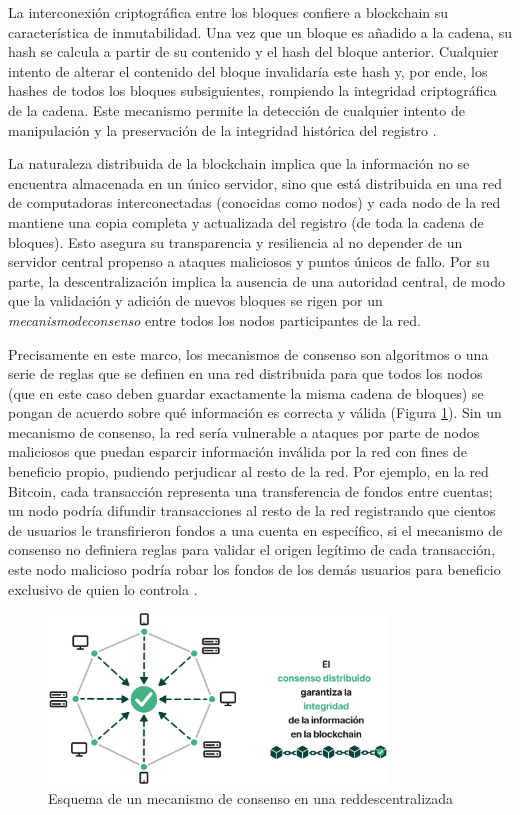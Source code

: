 La interconexión criptográfica entre los bloques confiere a blockchain su característica de inmutabilidad. Una vez que un bloque es añadido a la cadena, su hash se calcula a partir de su contenido y el hash del bloque anterior. Cualquier intento de alterar el contenido del bloque invalidaría este hash y, por ende, los hashes de todos los bloques subsiguientes, rompiendo la integridad criptográfica de la cadena. Este mecanismo permite la detección de cualquier intento de manipulación y la preservación de la integridad histórica del registro \cite{bulkowska2023implementation}. 

La naturaleza distribuida de la blockchain implica que la información no se encuentra almacenada en un único servidor, sino que está distribuida en una red de computadoras interconectadas (conocidas como nodos) y cada \gls{nodo} de la red mantiene una copia completa y actualizada del registro (de toda la cadena de bloques). Esto asegura su transparencia y resiliencia al no depender de un servidor central \cite{bulkowska2023implementation} propenso a ataques maliciosos y puntos únicos de fallo. Por su parte, la descentralización implica la ausencia de una autoridad central, de modo que la validación y adición de nuevos bloques se rigen por un \textit{\gls{mecanismodeconsenso}} entre todos los nodos participantes de la red. 

Precisamente en este marco, los mecanismos de consenso son algoritmos o una serie de reglas que se definen en una red distribuida para que todos los nodos (que en este caso deben guardar exactamente la misma cadena de bloques) se pongan de acuerdo sobre qué información es correcta y válida (Figura \ref{fig:decentralized-consensus}). Sin un mecanismo de consenso, la red sería vulnerable a ataques por parte de nodos maliciosos que puedan esparcir información inválida por la red con fines de beneficio propio, pudiendo perjudicar al resto de la red. Por ejemplo, en la red Bitcoin, cada transacción representa una transferencia de fondos entre cuentas; un nodo podría difundir transacciones al resto de la red registrando que cientos de usuarios le transfirieron fondos a una cuenta en específico, si el mecanismo de consenso no definiera reglas para validar el origen legítimo de cada transacción, este nodo malicioso podría robar los fondos de los demás usuarios para beneficio exclusivo de quien lo controla \cite{satoshi2008bitcoin}.

\begin{figure}[!htb]
    \centering
    \includegraphics[width=0.8\textwidth]{Figures/decentralized-consensus.png}
    \caption{Esquema de un mecanismo de consenso en una \gls{reddescentralizada}}
    \label{fig:decentralized-consensus}
\end{figure}

